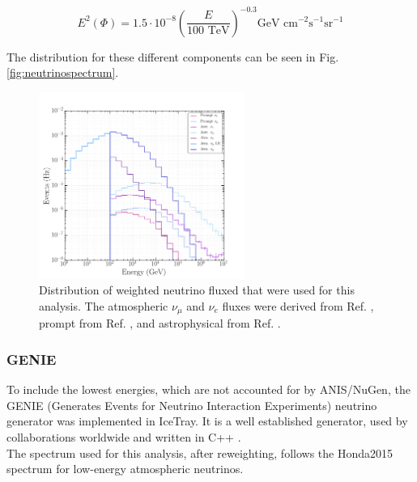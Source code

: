 \begin{equation}
E^2 \left(\Phi \right) = 1.5 \cdot 10^{-8} \left( \frac{E}{100 \textrm{ TeV}} \right)^{-0.3} \textrm{GeV } \textrm{cm}^{-2} \textrm{s}^{-1} \textrm{sr}^{-1}
\end{equation}

\noindent The distribution for these different components can be seen in Fig. \ref{fig:neutrinospectrum}.

\begin{figure}
\centering
\includegraphics[width=0.6\textwidth]{chapter6/img/neutrinoenergy.png}
\caption{Distribution of weighted neutrino fluxed that were used for this analysis. The atmospheric $\nu_\mu$ and $\nu_e$ fluxes were derived from Ref. \cite{Honda:2006qj}, prompt from Ref. \cite{Enberg:2008te}, and astrophysical from Ref. \cite{Aartsen:2014gkd}.}
\end{figure}

\subsubsection{GENIE}
To include the lowest energies, which are not accounted for by ANIS/NuGen, the GENIE (Generates Events for Neutrino Interaction Experiments) neutrino generator was implemented in IceTray. It is a well established generator, used by collaborations worldwide and written in C++ \cite{Andreopoulos:2009rq,Andreopoulos:2015wxa}.\\

\noindent The spectrum used for this analysis, after reweighting, follows the Honda2015 spectrum \cite{Honda:2015fna} for low-energy atmospheric neutrinos.

